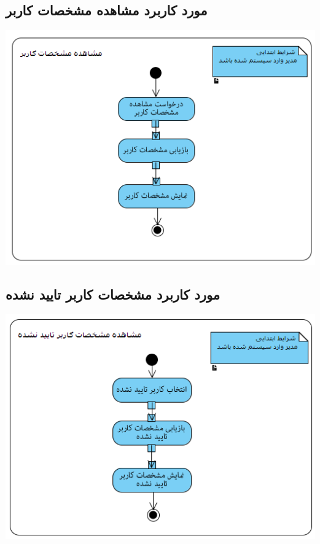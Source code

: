 \newpage
\vspace{2cm}
\subsection*{مورد کاربرد مشاهده مشخصات کاربر}
\vspace{2cm}
\begin{center}
\includegraphics[width=\textwidth]{ActivityDiagrams/4.png}
\end{center}

\newpage
\vspace{2cm}
\subsection*{مورد کاربرد مشخصات کاربر تایید نشده}
\vspace{2cm}
\begin{center}
\includegraphics[width=\textwidth]{ActivityDiagrams/5.png}
\end{center}

